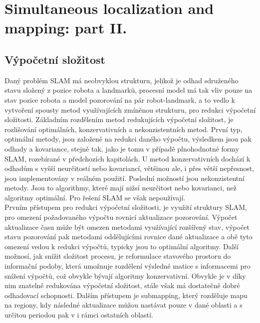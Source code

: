 \documentclass[11pt]{article}
\begin{document}
\section{Simultaneous localization and mapping: part II.}

\subsection{Výpočetní složitost}
Daný problém SLAM má neobvyklou strukturu, jelikož je odhad sdruženého stavu složený z pozice robota a landmarků, procesní model má tak vliv pouze na stav pozice robota a model pozorování na pár robot-landmark, a to vedlo k vytvoření spousty metod využívajících zmíněnou strukturu, pro redukci výpočetní složitosti. Základním rozdělením metod redukujících výpočetní složitost, je rozlišování optimálních, konzervativních a nekonzistentních metod. První typ, optimální metody, jsou založené na redukci daného výpočtu, výsledkem jsou pak odhady a kovariance, stejně tak, jako je tomu v případě plnohodnotné formy SLAM, rozebírané v předchozích kapitolách. U metod konzervativních dochází k odhadům s vyšší neurčitostí nebo kovariancí, většinou ale, i přes větší nepřesnost, jsou implementovány v reálném použití. Poslední možností jsou nekonzistentní metody. Jsou to algorithmy, které mají nižsí neurčitost nebo kovarianci, než algoritmy optimální. Pro řešení SLAM se však nepoužívají.\\
\indent Prvním přístupem pro redukci výpočetní složitosti, je využití struktury SLAM, pro omezení požadovaného výpočtu rovnicí aktualizace pozorování. Výpočet aktualizace času může být omezen metodami využívající rozšířený stav, výpočet stavu pozorování pak metodami oddělujícími rovnice dané aktualizace a obě tyto omezení vedou k redukci výpočtů, typicky jsou to optimální algoritmy. Další možnosí, jak snížit složitost procesu, je reformulace stavového prostoru do informační podoby, která umožnuje rozdělení výsledné matice s informacemi pro snížení výpočtů, což obvykle bývají algoritmy konzervativní. Obvykle je v díky nim znatelně redukována výpočetní složitost, stále však má dostatečně dobré odhadovací schopnosti. Dalším přístupem je submapping, který rozděluje mapu na regiony, kdy následné aktualizace můžou nastávat pouze v dané oblasti a s určitou periodou pak v i rámci ostatních oblastí. 
\end{document}
